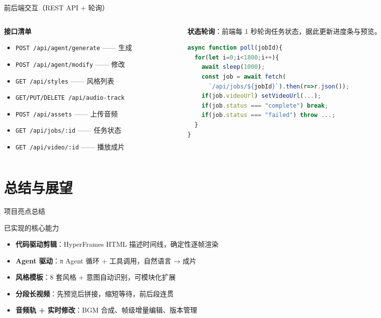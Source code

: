 \documentclass[aspectratio=169,11pt]{beamer}
\begin{document}
\begin{frame}[fragile]{前后端交互（REST API + 轮询）}
  \begin{columns}[T]
    \begin{column}{0.5\textwidth}
      \textbf{接口清单}
      \begin{itemize}
        \item \texttt{POST /api/agent/generate} —— 生成
        \item \texttt{POST /api/agent/modify} —— 修改
        \item \texttt{GET /api/styles} —— 风格列表
        \item \texttt{GET/PUT/DELETE /api/audio-track}
        \item \texttt{POST /api/assets} —— 上传音频
        \item \texttt{GET /api/jobs/:id} —— 任务状态
        \item \texttt{GET /api/video/:id} —— 播放成片
      \end{itemize}
    \end{column}
    \begin{column}{0.5\textwidth}
      \textbf{状态轮询}：前端每 1 秒轮询任务状态，据此更新进度条与预览。
      \begin{lstlisting}[language=JavaScript, basicstyle=\ttfamily\tiny]
async function poll(jobId){
  for(let i=0;i<1800;i++){
    await sleep(1000);
    const job = await fetch(
      `/api/jobs/${jobId}`).then(r=>r.json());
    if(job.videoUrl) setVideoUrl(...);
    if(job.status === "complete") break;
    if(job.status === "failed") throw ...;
  }
}
      \end{lstlisting}
    \end{column}
  \end{columns}
\end{frame}

\section{总结与展望}

\begin{frame}{项目亮点总结}
  \begin{block}{已实现的核心能力}
    \begin{itemize}
      \item \textbf{代码驱动剪辑}：HyperFrames HTML 描述时间线，确定性逐帧渲染
      \item \textbf{Agent 驱动}：π Agent 循环 + 工具调用，自然语言 → 成片
      \item \textbf{风格模板}：8 套风格 + 意图自动识别，可模块化扩展
      \item \textbf{分段长视频}：先预览后拼接，缩短等待，前后段连贯
      \item \textbf{音频轨 + 实时修改}：BGM 合成、帧级增量编辑、版本管理
    \end{itemize}
  \end{block}
\end{frame}
\end{document}
